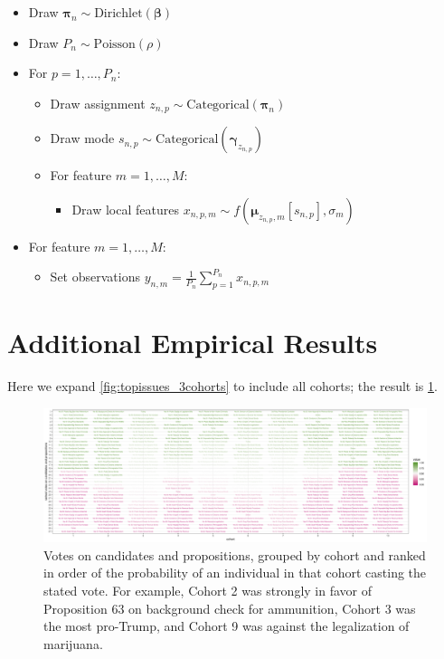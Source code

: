 \documentclass[twoside,11pt]{article}
\begin{document}
\begin{itemize}
\begin{itemize}
        \item Draw $\boldsymbol{\pi}_n \sim \mbox{Dirichlet}( \boldsymbol{\beta})$
        \item Draw $P_n \sim \mbox{Poisson}(\rho)$
        \item For $p=1,\dots,P_n$:
        \begin{itemize}
            \item Draw assignment $z_{n,p} \sim \mbox{Categorical}(\boldsymbol{\pi}_n)$
            \item Draw mode $s_{n,p} \sim \mbox{Categorical}(\boldsymbol{\gamma}_{z_{n,p}})$
            \item For feature $m=1,\dots,M$:
            \begin{itemize}
                \item Draw local features $x_{n,p,m} \sim f\left(\boldsymbol{\mu}_{z_{n,p},m}[s_{n,p}], \sigma_m \right)$
            \end{itemize}
        \end{itemize}
        \item For feature $m=1,\dots,M$:
        \begin{itemize}
            \item Set observations $y_{n,m} = \frac{1}{P_n}\sum_{p=1}^{P_n} x_{n,p,m}$ 
        \end{itemize}
    \end{itemize}
\end{itemize}


\section{Additional Empirical Results}
\label{sec:app_detailed_results}
Here we expand \cref{fig:topissues_3cohorts} to include all cohorts; the result is \cref{fig:topissues_all}.

\begin{figure}
\centering
\includegraphics[width=\textwidth]{top_isses_all.pdf}
\caption{Votes on candidates and propositions, grouped by cohort and ranked in order of the probability of an individual in that cohort casting the stated vote.  For example, Cohort 2 was strongly in favor of Proposition 63 on background check for ammunition, Cohort 3 was the most pro-Trump, and Cohort 9 was against the legalization of marijuana.}
\label{fig:topissues_all}
\end{figure}
\end{document}
